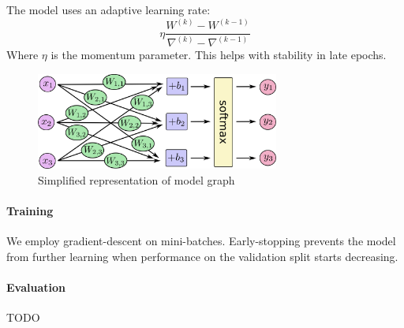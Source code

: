 \documentclass[a4paper]{article}
\begin{document}
The model uses an adaptive learning rate:
$$\eta \frac{ W^{(k)} - W^{(k-1)} } { \nabla^{(k)} - \nabla^{(k-1)} }$$
Where $\eta$ is the momentum parameter. This helps with stability in late epochs.

\begin{figure}[htb]
\centering
\includegraphics[width=8cm]{images/model-graph.png}
\caption{Simplified representation of model graph \cite{tf}}
\end{figure}

\paragraph{Training} We employ gradient-descent on mini-batches. Early-stopping prevents the model from further learning when performance on the validation split starts decreasing.

\paragraph{Evaluation}
TODO






\newpage

    
    
\end{document}
